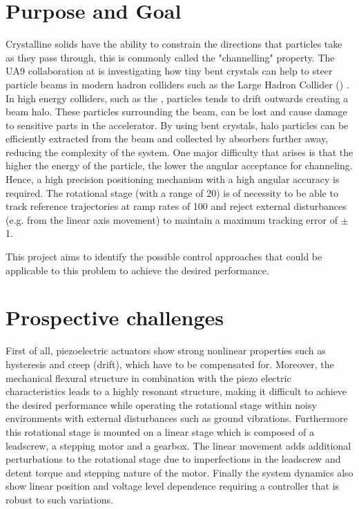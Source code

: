 \section{Purpose and Goal}
Crystalline solids have the ability to constrain the directions that particles take as they pass through, this is commonly called the "channelling" property. The UA9 collaboration at \abbrCERN is investigating how tiny bent crystals can help to steer particle beams in modern hadron colliders such as the Large Hadron Collider (\abbrLHC) \citep{WebsiteUA9:2016}. In high energy colliders, such as the \abbrLHC, particles tends to drift outwards creating a beam halo. These particles surrounding the beam, can be lost and cause damage to sensitive parts in the accelerator. By using bent crystals, halo particles can be efficiently extracted from the beam and collected by absorbers further away, reducing the complexity of the system. One major difficulty that arises is that the higher the energy of the particle, the lower the angular acceptance for channeling. Hence, a high precision positioning mechanism with a high angular accuracy is required. The rotational stage (with a range of \unit{20}{\milli\rad}) is of necessity to be able to track reference trajectories at ramp rates of \unit{100}{\micro\radianpersecond} and reject external disturbances (e.g. from the linear axis movement) to maintain a maximum tracking error of $\pm$\unit{1}{\micro\rad}.

This project aims to identify the possible control approaches that could be applicable to this problem to achieve the desired performance.

\section{Prospective challenges}
First of all, piezoelectric  actuators show strong nonlinear properties such as hysteresis and creep (drift), which have to be compensated for. Moreover, the mechanical flexural structure in combination with the piezo electric characteristics leads to a highly resonant structure, making it difficult to achieve the desired performance while operating the rotational stage within noisy environments with external disturbances such as ground vibrations. Furthermore this rotational stage is mounted on a linear stage which is composed of a leadscrew, a stepping motor and a gearbox. The linear movement adds additional perturbations to the rotational stage due to imperfections in the leadscrew and detent torque and stepping nature of the motor. Finally the system dynamics also show linear position and voltage level dependence requiring a controller that is robust to such variations.

